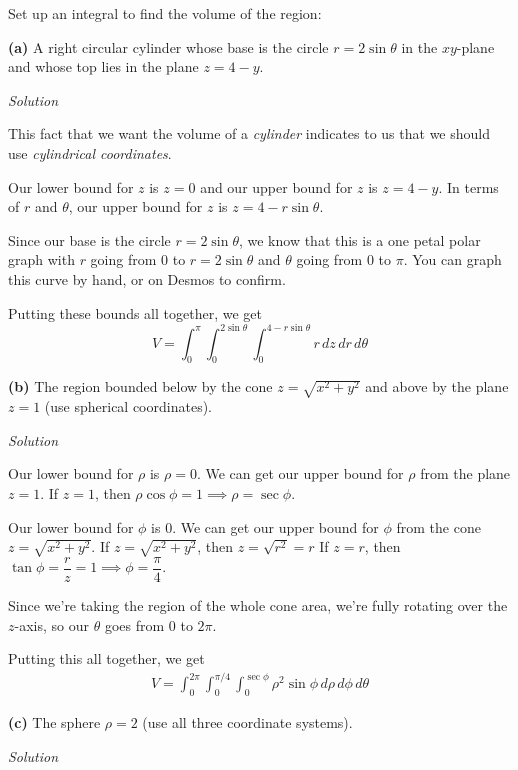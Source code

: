 \documentclass{article}
\newcommand{\Solution}{\textit{Solution}}
\begin{document}
Set up an integral to find the volume of the region:

{}
\textbf{(a)} A right circular cylinder whose base is the circle $r=2\sin\theta$ in the $xy$-plane and whose top lies in the plane $z=4-y$.

\Solution

This fact that we want the volume of a \textit{cylinder} indicates to us that we should use \textit{cylindrical coordinates}.

Our lower bound for $z$ is $z=0$ and our upper bound for $z$ is $z=4-y$. In terms of $r$ and $\theta$, our upper bound for $z$ is $z=4-r\sin\theta$.

Since our base is the circle $r=2\sin\theta$, we know that this is a one petal polar graph with $r$ going from $0$ to $r=2\sin\theta$ and $\theta$ going from $0$ to $\pi$. You can graph this curve by hand, or on Desmos to confirm.

Putting these bounds all together, we get
\begin{equation*}
    \boxed{V=\int_0^\pi\int_0^{2\sin\theta}\int_0^{4-r\sin\theta}r\,dz\,dr\,d\theta}
\end{equation*}
{}\textbf{(b)} The region bounded below by the cone $z=\sqrt{x^2+y^2}$ and above by the plane $z = 1$ (use spherical coordinates).

\Solution

Our lower bound for $\rho$ is $\rho =0$. We can get our upper bound for $\rho$ from the plane $z=1$. If $z=1$, then $\rho \cos \phi=1\implies \rho = \sec\phi$.

Our lower bound for $\phi$ is $0$. We can get our upper bound for $\phi$ from the cone $z=\sqrt{x^2+y^2}$. If $z=\sqrt{x^2+y^2}$, then $z=\sqrt{r^2}=r$ If $z=r$, then $\tan \phi = \dfrac{r}{z}=1\implies\phi =\dfrac{\pi}{4}$.

Since we're taking the region of the whole cone area, we're fully rotating over the $z$-axis, so our $\theta$ goes from $0$ to $2\pi$.

Putting this all together, we get
\begin{align*}
   \boxed{ V=\int_0^{2\pi}\int_0^{\pi/4}\int_0^{\sec \phi} \rho^2 \sin\phi \, d\rho\,d\phi\,d\theta}
\end{align*}
{}\textbf{(c)} The sphere $\rho =2$ (use all three coordinate systems).

\Solution
\end{document}
